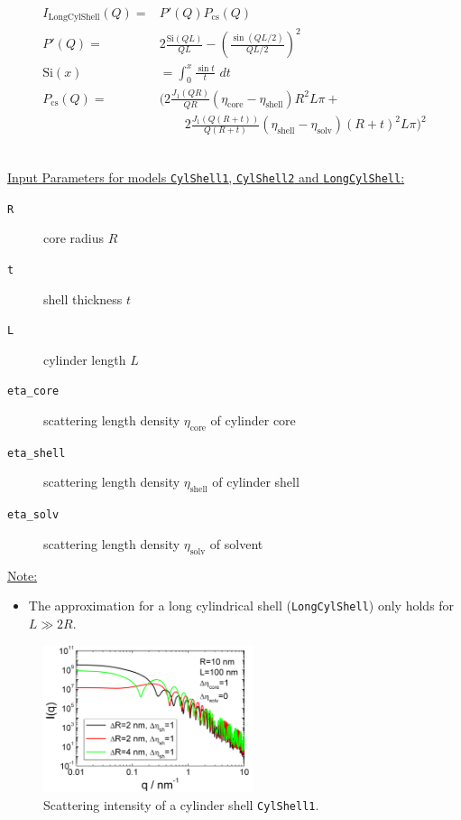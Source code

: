 \begin{align}
  I_\text{LongCylShell}(Q) = & P'(Q) P_\text{cs}(Q) \\
  P'(Q)  = & 2 \frac{\text{Si}(Q L)}{QL} - \left(\frac{\sin(QL/2)}{QL/2}\right)^2 \\
  \text{Si}(x) & = \int_0^x\!\frac{\sin t}{t}\,\,dt \\
  P_\text{cs}(Q)  =  & \biggl(
            2\frac{J_1(QR)}{QR}
            \left(\eta_\text{core}-\eta_\text{shell}\right)R^2L\pi + \\
         & \qquad
            2\frac{J_1(Q(R+t))}{Q(R+t)}
            \left(\eta_\text{shell}-\eta_\text{solv}\right)(R+t)^2L\pi
      \biggr)^2  \nonumber
\end{align}


\vspace{5mm}

\hspace{1pt}\\
\uline{Input Parameters for models \texttt{CylShell1}, \texttt{CylShell2} and \texttt{LongCylShell}:}\\
\begin{description}
\item[\texttt{R}] core radius $R$
\item[\texttt{t}] shell thickness $t$
\item[\texttt{L}] cylinder length $L$
\item[\texttt{eta\_core}] scattering length density $\eta_\text{core}$ of cylinder core
\item[\texttt{eta\_shell}] scattering length density $\eta_\text{shell}$ of cylinder shell
\item[\texttt{eta\_solv}] scattering length density $\eta_\text{solv}$ of solvent
\end{description}

\uline{Note:}
\begin{itemize}
\item The approximation for a long cylindrical shell (\texttt{LongCylShell}) only holds for $L \gg 2R$.
\end{itemize}

\begin{figure}[htb]
\begin{center}
\includegraphics[width=0.55\textwidth]{../images/form_factor/cylindrical_obj/CylShell1IQ.png}
\end{center}
\caption{Scattering intensity of a cylinder shell \texttt{CylShell1}.}
\label{fig:CylShell1}
\end{figure}

